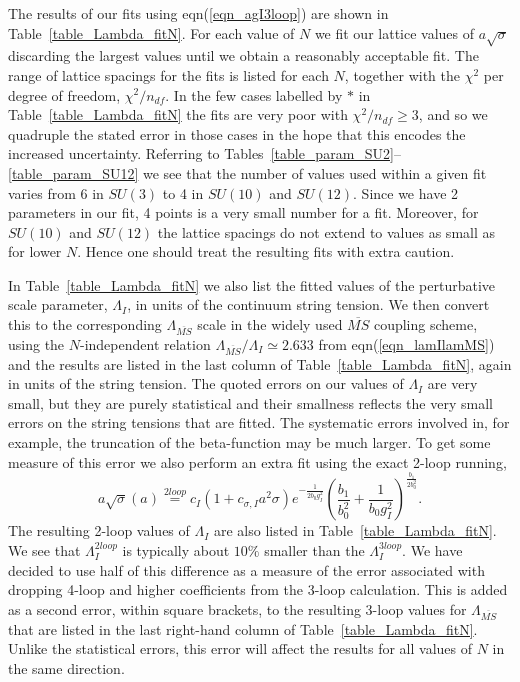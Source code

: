 \documentclass[12pt]{article}
\newcommand{\be}{\begin{equation}}
\newcommand{\ee}{\end{equation}}
\begin{document}
The results of our fits using eqn(\ref{eqn_agI3loop}) are shown in Table~\ref{table_Lambda_fitN}.
For each value of $N$ we fit our lattice values of $a\surd\sigma$ discarding the largest
values until we obtain a reasonably acceptable fit. The range of lattice spacings for the fits
is listed for each $N$, together with the $\chi^2$ per degree of freedom, $\chi^2/n_{df}$.
In the few cases labelled by $\ast$ in  Table~\ref{table_Lambda_fitN} the fits are very poor
with $\chi^2/n_{df} \geq 3$, and so we quadruple the stated
error in those cases in the hope that this encodes the increased uncertainty.
Referring to  Tables~\ref{table_param_SU2}--\ref{table_param_SU12}
we see that the number of values used within a given fit varies from 6 in $SU(3)$ to 4 in
$SU(10)$ and $SU(12)$. Since we have 2 parameters in our fit, 4 points is a very small number
for a fit. Moreover, for $SU(10)$ and $SU(12)$ the lattice spacings do not extend to values as small 
as for lower $N$. Hence one should treat the resulting fits with extra caution.

In Table~\ref{table_Lambda_fitN}
we also list the fitted values of the perturbative scale parameter, $\Lambda_I$, in units of the
continuum string tension. We then convert this to the corresponding $\Lambda_{\overline{MS}}$
scale in the widely used $\overline{MS}$ coupling scheme, using the $N$-independent relation
$\Lambda_{\overline{MS}}/\Lambda_I \simeq 2.633$ from eqn(\ref{eqn_lamIlamMS})
and the results are listed in the last column of Table~\ref{table_Lambda_fitN}, again
in units of the string tension. The quoted errors on our values of $\Lambda_I$ are very small,
but they are purely statistical and their smallness reflects the very small errors on the
string tensions that are fitted. The systematic errors involved in, for example, the
truncation of the beta-function may be much larger. To get some measure of this
error we also perform an extra fit using the exact 2-loop running,
%
\be
a \sqrt\sigma(a) \stackrel{2 loop}{=}  c_I \left( 1 + c_{\sigma,I} a^2\sigma \right)
e^{-\frac{1}{2b_0 g_I^2}}
\left(\frac{b_1}{b_0^2}+\frac{1}{b_0 g_I^2}
\right)^{\frac{b_1}{2b_0^2}}.
\label{eqn_agI2loop}
\ee
%
The resulting 2-loop values of $\Lambda_I$ are also listed in  Table~\ref{table_Lambda_fitN}.
We see that $\Lambda^{2loop}_I$ is typically about $10\%$ smaller than the $\Lambda^{3loop}_I$.
We have decided to use half of this difference as a measure of the error associated
with dropping 4-loop and higher coefficients from the 3-loop calculation. This is
added as a second error, within square brackets, to the resulting 3-loop values for 
$\Lambda_{\overline{MS}}$ that are listed in the last right-hand column of
Table~\ref{table_Lambda_fitN}. Unlike the statistical errors, this error will affect
the results for all values of $N$ in the same direction. 
\end{document}
